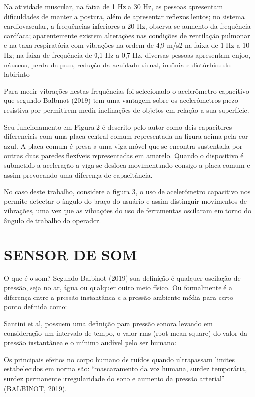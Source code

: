 \begin{citacao}
Na atividade muscular, na faixa de 1 Hz a 30 Hz, as pessoas apresentam dificuldades de manter a postura, além de apresentar reflexos lentos; no sistema cardiovascular, a frequências inferiores a 20 Hz, observa-se aumento da frequência cardíaca; 	aparentemente existem alterações nas condições de ventilação pulmonar e na taxa respiratória com vibrações na ordem de 4,9 m/s2 na faixa de 1 Hz a 10 Hz; 	na faixa de frequência de 0,1 Hz a 0,7 Hz, diversas pessoas apresentam enjoo, náuseas, perda de peso, redução da acuidade visual, insônia e distúrbios do labirinto 
\end{citacao}

Para medir vibrações nestas frequências foi selecionado o acelerômetro capacitivo que segundo Balbinot (2019) tem uma vantagem sobre os acelerômetros piezo resistiva por permitirem medir inclinações de objetos em relação a sua superfície.

Seu funcionamento em Figura 2 é descrito pelo autor como dois capacitores diferenciais com uma placa central comum representada na figura acima pela cor azul. A placa comum é presa a uma viga móvel que se encontra sustentada por outras duas paredes flexíveis representadas em amarelo. Quando o dispositivo é submetido a aceleração a viga se desloca movimentando consigo a placa comum e assim provocando uma diferença de capacitância.

No caso deste trabalho, considere a figura 3, o uso de acelerômetro capacitivo nos permite detectar o ângulo do braço do usuário e assim distinguir movimentos de vibrações, uma vez que as vibrações do uso de ferramentas oscilaram em torno do ângulo de trabalho do operador.


\section{SENSOR DE SOM}
\label{subsec: sensorDeSom}

O que é o som? Segundo Balbinot (2019) sua definição é qualquer oscilação de pressão, seja no ar, água ou qualquer outro meio físico. Ou formalmente é a diferença entre a pressão instantânea e a pressão ambiente média para certo ponto definida como:

Santini et al, possuem uma definição para pressão sonora levando em consideração um intervalo de tempo, o valor rms (root mean square) do valor da pressão instantânea e o mínimo audível pelo ser humano:

Os principais efeitos no corpo humano de ruídos quando ultrapassam limites estabelecidos em norma são: “mascaramento da voz humana, surdez temporária, surdez permanente irregularidade do sono e aumento da pressão arterial” (BALBINOT, 2019).

